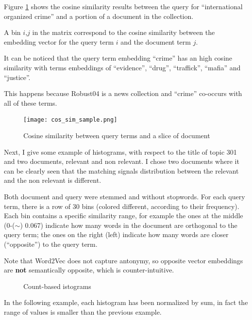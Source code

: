 Figure \ref{fig:cos_sim_sample} shows the cosine similarity results between the query for ``international organized crime'' and a portion of a document in the collection.

A bin $i$,$j$ in the matrix correspond to the cosine similarity between the embedding vector for the query term $i$ and the document term $j$.

It can be noticed that the query term embedding ``crime'' has an high cosine similarity with terms embeddings of ``evidence'', ``drug'', ``traffick'', ``mafia'' and ``justice''.

This happens because Robust04 \cite{rob04} is a news collection and ``crime'' co-occurs with all of these terms.

\begin{figure}[H]
  \centering
  \texttt{[image: cos\_sim\_sample.png]}
  \caption{Cosine similarity between query terms and a slice of document}
  \label{fig:cos_sim_sample}
\end{figure}

Next, I give some example of histograms, with respect to the title of topic 301 and two documents, relevant and non relevant. I chose two documents where it can be clearly seen that the matching signals distribution between the relevant and the non relevant is different.

Both document and query were stemmed and without stopwords. For each query term, there is a row of 30 bins (colored different, according to their frequency). Each bin contains a specific similarity range, for
example the ones at the middle (0-($\sim$) 0.067) indicate how many words in the document are orthogonal to the query term; the ones on the right (left) indicate how many words are closer (``opposite'') to the query term.

Note that Word2Vec does not capture antonymy, so opposite vector embeddings are \textbf{not} semantically opposite, which is counter-intuitive.

\begin{figure}[H]
  \centering
  \hfill
  \caption{Count-based istograms}
  \label{fig:hist_ex}
\end{figure}

In the following example, each histogram has been normalized by sum, in fact
the range of values is smaller than the previous example.

